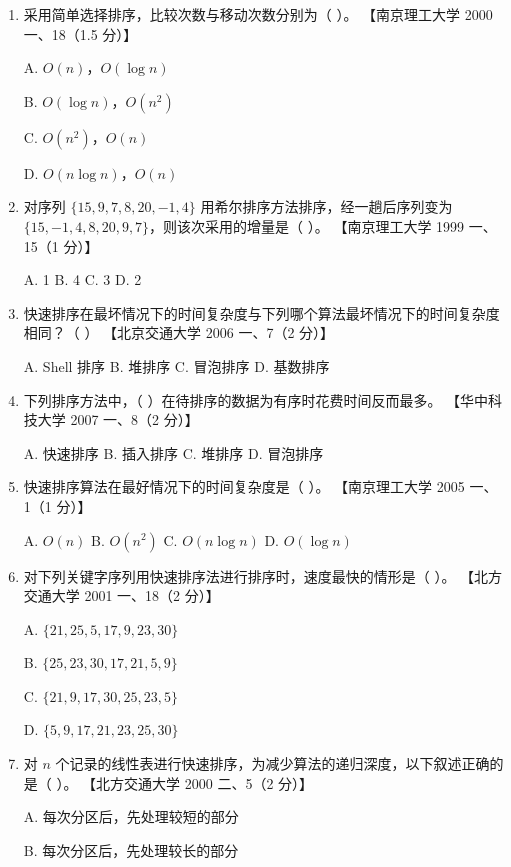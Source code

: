 \documentclass[lang=cn,newtx,10pt,scheme=chinese]{../../elegantbook}
\begin{document}
\begin{enumerate}
    \item 采用简单选择排序，比较次数与移动次数分别为（ ）。  
    【南京理工大学 2000 一、18（1.5 分）】  

    A. $O(n)$，$O(\log n)$  

    B. $O(\log n)$，$O(n^2)$  

    C. $O(n^2)$，$O(n)$  

    D. $O(n \log n)$，$O(n)$  

    \item 对序列 $\{15, 9, 7, 8, 20, -1, 4\}$ 用希尔排序方法排序，经一趟后序列变为 $\{15, -1, 4,8,20,9,7\}$，则该次采用的增量是（ ）。  
    【南京理工大学 1999 一、15（1 分）】  

    A. 1 \quad B. 4 \quad C. 3 \quad D. 2  

    \item 快速排序在最坏情况下的时间复杂度与下列哪个算法最坏情况下的时间复杂度相同？（ ）  
    【北京交通大学 2006 一、7（2 分）】  

    A. Shell 排序 \quad B. 堆排序 \quad C. 冒泡排序 \quad D. 基数排序  

    \item 下列排序方法中，（ ）在待排序的数据为有序时花费时间反而最多。  
    【华中科技大学 2007 一、8（2 分）】  

    A. 快速排序 \quad B. 插入排序 \quad C. 堆排序 \quad D. 冒泡排序  

    \item 快速排序算法在最好情况下的时间复杂度是（ ）。  
    【南京理工大学 2005 一、1（1 分）】  

    A. $O(n)$ \quad B. $O(n^2)$ \quad C. $O(n \log n)$ \quad D. $O(\log n)$  

    \item 对下列关键字序列用快速排序法进行排序时，速度最快的情形是（ ）。  
    【北方交通大学 2001 一、18（2 分）】  

    A. $\{21, 25, 5, 17, 9, 23, 30\}$ 

    B. $\{25, 23, 30, 17, 21, 5, 9\}$  

    C. $\{21, 9, 17, 30, 25, 23, 5\}$ 
    
    D. $\{5, 9, 17, 21, 23, 25, 30\}$  

    \item 对 $n$ 个记录的线性表进行快速排序，为减少算法的递归深度，以下叙述正确的是（ ）。  
    【北方交通大学 2000 二、5（2 分）】  

    A. 每次分区后，先处理较短的部分  

    B. 每次分区后，先处理较长的部分  


\end{enumerate}
\end{document}
